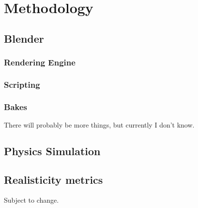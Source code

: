 \chapter{Methodology}\label{ch:methodology}


\section{Blender}\label{sec:blender}

\subsection{Rendering Engine}\label{subsec:rendering-engine}

\subsection{Scripting}\label{subsec:scripting}

\subsection{Bakes}\label{subsec:bakes}

There will probably be more things, but currently I don't know.

\section{Physics Simulation}\label{sec:physics-simulation}


\section{Realisticity metrics}\label{sec:realisticity-metrics}

Subject to change.